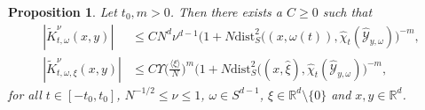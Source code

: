 \documentclass{amsart}
\numberwithin{equation}{section}
\newtheorem{proposition}[theorem]{Proposition}
\theoremstyle{definition}
\newcommand{\Rd}{\mathbb{R}^{d}}
\newcommand {\w}{\omega}
\newcommand {\rb}{\rangle}
\newcommand {\lb}{\langle}
\begin{document}
\begin{proposition}\label{prop:KernelEstimatesFrequencyLocalization}
Let $t_{0},m>0$. Then there exists a $C\geq0$ such that
\begin{equation*}
\begin{split}
    |\tilde{K}^{\nu}_{t,\w}(x,y)| &\leq CN^{d} \nu^{d-1} \big(1+N \text{dist}_S^2((x,\omega(t)),\hat{\chi}_t(\hat{\mathcal{Y}}_{y,\omega})\big)^{-m},\\
    |\tilde{K}^{\nu}_{t,\w,\xi}(x,y)| &\leq C\Upsilon \big( \tfrac{\lb\xi\rb}{N} \big)^{m}\big(1+ N \text{dist}_S^2((x,\hat{\xi}),\hat{\chi}_t(\hat{\mathcal{Y}}_{y,\omega})\big)^{-m},
\end{split}
\end{equation*}
for all $t\in[-t_{0},t_{0}]$, $N^{-1/2}\leq \nu\leq 1$, $\w\in S^{d-1}$, $\xi\in\Rd\setminus\{0\}$ and $x,y\in\Rd$.
\end{proposition}
\end{document}
